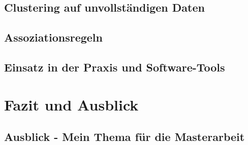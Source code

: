 \documentclass[11pt,fleqn]{book}
\begin{document}
\section{Clustering auf unvollständigen Daten}

\section{Assoziationsregeln}
\section{Einsatz in der Praxis und Software-Tools}




\chapter{Fazit und Ausblick}
\section{Ausblick - Mein Thema für die Masterarbeit}


\printbibliography
\vfill
\end{document}

